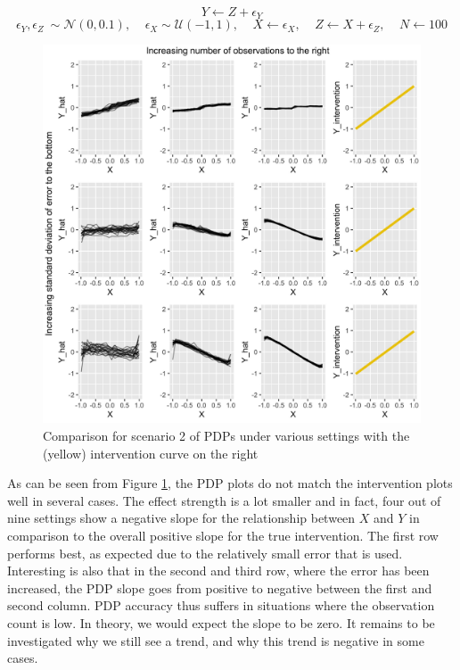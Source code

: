 \documentclass[]{krantz}
\begin{document}
\[ Y \leftarrow Z + \epsilon_Y  \]
\[ \epsilon_Y,\epsilon_Z ~ \sim \mathcal{N}(0, 0.1), \ \ \ \ \ \epsilon_X \sim \mathcal{U}(-1,1), \ \ \ \ \ X \leftarrow \epsilon_X, \ \ \ \ \ Z \leftarrow X + \epsilon_Z, \ \ \ \ \ N \leftarrow 100 \]

\begin{figure}

\includegraphics[width=1\linewidth]{images/scenario2_all} \hfill{}

\caption{Comparison for scenario 2 of PDPs under various settings with the (yellow) intervention curve on the right}\label{fig:Figure6}
\end{figure}

As can be seen from Figure \ref{fig:Figure6}, the PDP plots do not match
the intervention plots well in several cases. The effect strength is a
lot smaller and in fact, four out of nine settings show a negative slope
for the relationship between \(X\) and \(Y\) in comparison to the
overall positive slope for the true intervention. The first row performs
best, as expected due to the relatively small error that is used.
Interesting is also that in the second and third row, where the error
has been increased, the PDP slope goes from positive to negative between
the first and second column. PDP accuracy thus suffers in situations
where the observation count is low. In theory, we would expect the slope
to be zero. It remains to be investigated why we still see a trend, and
why this trend is negative in some cases.
\end{document}
